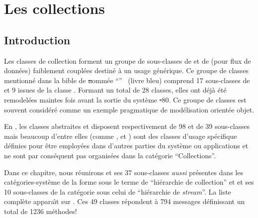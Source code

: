 \documentclass[a4paper,10pt,twoside]{book}
\begin{document}
	\renewcommand{\nnbb}[2]{} %
	\sloppy
\fi
\chapter{Les collections}
\label{cha:collections}

\section{Introduction}

Les classes de collection forment un groupe de sous-classes de  et de  (pour flux de donn\'ees) faiblement coupl\'ees destin\'e \`a un usage g\'en\'erique.
Ce groupe de classes mentionn\'e dans la bible de \st nomm\'ee ``''~\cite{Gold83a} (livre bleu) comprend 17 sous-classes de  
et 9 issues de la classe . Formant un total de 28 classes, elles
ont d\'ej\`a \'et\'e remodel\'ees maintes fois avant la sortie du syst\`eme \st-80. Ce groupe de classes est souvent consid\'er\'e comme un exemple pragmatique
de mod\'elisation orient\'ee objet.

En \squeak, les classes abstraites  et 
disposent respectivement de 98 et de 39 sous-classes mais beaucoup d'entre elles
(comme \mbox{,}  et )
sont des classes d'usage sp\'ecifique d\'efinies pour \^etre employ\'ees
dans d'autres parties du syst\`eme ou applications et ne sont par cons\'equent pas organis\'ees dans la cat\'egorie ``Collections''. 

Dans ce chapitre, nous r\'eunirons  et ses 37 sous-classes
\emph{aussi} pr\'esentes dans les cat\'egories-syst\`eme de la forme 
sous le terme de ``hi\'erarchie de collection''
et  et ses 10 sous-classes de la cat\'egorie  sous celui de ``hi\'erarchie de \emph{stream}''.
La liste compl\`ete appara\^{\i}t sur .
Ces 49 classes r\'epondent \`a 794 messages d\'efinissant un total de 1236 m\'ethodes!
\end{document}
